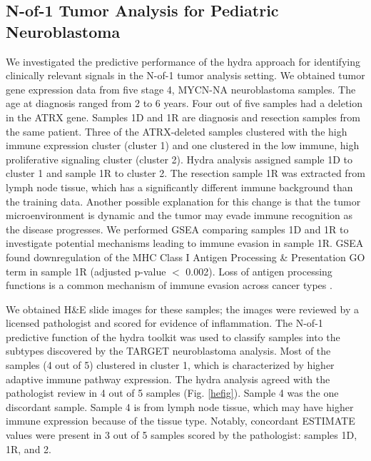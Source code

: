 \documentclass[10pt,letterpaper]{article}
\begin{document}
\subsection{N-of-1 Tumor Analysis for Pediatric Neuroblastoma}
We investigated the predictive performance of the hydra approach for identifying clinically relevant signals in the N-of-1 tumor analysis setting. We obtained tumor gene expression data from five stage 4, MYCN-NA neuroblastoma samples. The age at diagnosis ranged from 2 to 6 years. Four out of five samples had a deletion in the ATRX gene. Samples 1D and 1R are diagnosis and resection samples from the same patient. Three of the ATRX-deleted samples clustered with the high immune expression cluster (cluster 1) and one clustered in the low immune, high proliferative signaling cluster (cluster 2). Hydra analysis assigned sample 1D to cluster 1 and sample 1R to cluster 2. The resection sample 1R was extracted from lymph node tissue, which has a significantly different immune background than the training data. Another possible explanation for this change is that the tumor microenvironment is dynamic and the tumor may evade immune recognition as the disease progresses. We performed GSEA comparing samples 1D and 1R to investigate potential mechanisms leading to immune evasion in sample 1R. GSEA found downregulation of the MHC Class I Antigen Processing \& Presentation GO term in sample 1R (adjusted p-value $<$ 0.002). Loss of antigen processing functions is a common mechanism of immune evasion across cancer types \cite{reevesAntigenProcessingImmune2017}.

We obtained H\&E slide images for these samples; the images were reviewed by a licensed pathologist and scored for evidence of inflammation. The N-of-1 predictive function of the hydra toolkit was used to classify samples into the subtypes discovered by the TARGET neuroblastoma analysis. Most of the samples (4 out of 5) clustered in cluster 1, which is characterized by higher adaptive immune pathway expression. The hydra analysis agreed with the pathologist review in 4 out of 5 samples (Fig. \ref{hefig}). Sample 4 was the one discordant sample. Sample 4 is from lymph node tissue, which may have higher immune expression because of the tissue type. Notably, concordant ESTIMATE values were present in 3 out of 5 samples scored by the pathologist: samples 1D, 1R, and 2. 
\end{document}
